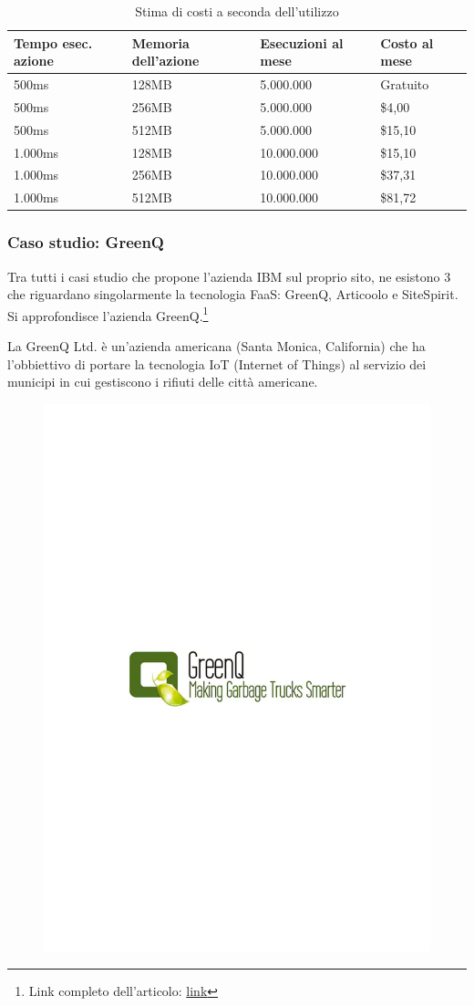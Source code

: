 \documentclass[a4paper]{article}
\begin{document}
	\begin{table}[!htp]
		\centering
		\begin{tabular}{@{} l l l l @{}}
			\toprule
			Tempo esec. azione & Memoria dell'azione & Esecuzioni al mese & Costo al mese \\
			\midrule
			500ms	& 128MB & 5.000.000		& Gratuito \\
			500ms	& 256MB & 5.000.000		& \$4,00 \\
			500ms	& 512MB & 5.000.000		& \$15,10 \\
			1.000ms	& 128MB & 10.000.000	& \$15,10 \\
			1.000ms	& 256MB & 10.000.000	& \$37,31 \\
			1.000ms	& 512MB & 10.000.000	& \$81,72 \\
			\bottomrule
		\end{tabular}
		\caption{Stima di costi a seconda dell'utilizzo}
	\end{table}
	
	\subsubsection{Caso studio: GreenQ}
	
	Tra tutti i casi studio che propone l'azienda IBM sul proprio sito, ne esistono 3 che riguardano singolarmente la tecnologia FaaS: GreenQ, Articoolo e SiteSpirit. Si approfondisce l'azienda GreenQ.\footnote{Link completo dell'articolo: \href{https://www.ibm.com/case-studies/greenq-ltd}{link}}\newline
	
	\noindent
	La GreenQ Ltd. è un'azienda americana (Santa Monica, California) che ha l'obbiettivo di portare la tecnologia IoT (Internet of Things) al servizio dei municipi in cui gestiscono i rifiuti delle città americane.
	
	\begin{figure}[!htp]
		\centering
		\includegraphics[width=.5\textwidth]{img/GreenQ-logo.pdf}
	\end{figure}
	
\end{document}

